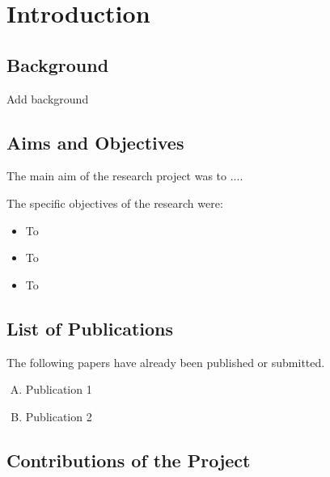 \documentclass[12pt]{report}
\begin{document}
\chapter{Introduction}

\section{Background}


Add background



\lipsum[2-6]


\section{Aims and Objectives}

The main aim of the research project was to ....

The specific objectives of the research were:

\begin{itemize}[topsep=0pt]

\item To 

\item To 

\item To 

\end{itemize}









\section{List of Publications}


The following papers have already been published or submitted.
\begin{enumerate}[P.1,topsep=0pt]

	\item Publication 1

	\item Publication 2

\end{enumerate}





\section{Contributions of the Project}
\end{document}
